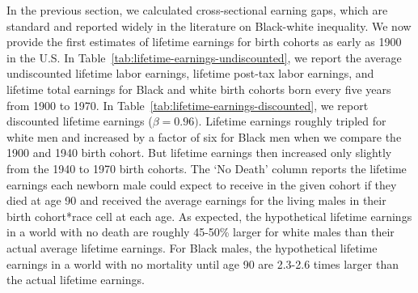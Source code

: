 \documentclass[12pt]{article}
\begin{document}
In the previous section, we calculated cross-sectional earning gaps, which are standard and reported widely in the literature on Black-white inequality. 
We now provide the first estimates of lifetime earnings for birth cohorts as early as 1900 in the U.S. 
In Table~\ref{tab:lifetime-earnings-undiscounted}, we report the average undiscounted lifetime labor earnings, lifetime post-tax labor earnings, and lifetime total earnings for Black and white birth cohorts born every five years from 1900 to 1970. 
In Table~\ref{tab:lifetime-earnings-discounted}, we report discounted lifetime earnings ($\beta=0.96)$. 
Lifetime earnings roughly tripled for white men and increased by a factor of six for Black men when we compare the 1900 and 1940 birth cohort. 
But lifetime earnings then increased only slightly from the 1940 to 1970 birth cohorts. 
The `No Death' column reports the lifetime earnings each newborn male could expect to receive in the given cohort if they died at age 90 and received the average earnings for the living males in their birth cohort*race cell at each age. 
As expected, the hypothetical lifetime earnings in a world with no death are roughly 45-50\% larger for white males than their actual average lifetime earnings. 
For Black males, the hypothetical lifetime earnings in a world with no mortality until age 90 are 2.3-2.6 times larger than the actual lifetime earnings.
\end{document}
